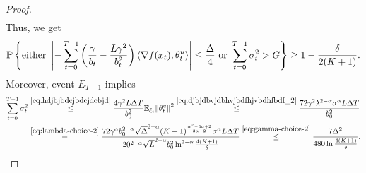 \documentclass{article}
\begin{document}
\begin{proof}
\begin{align*}
    \end{align*}
    Thus, we get
    \begin{align*}
        \mathbb{P}\left\{\text{either }\left|- \sum\limits_{t=0}^{T-1}\left(\frac{\gamma}{b_t} - \frac{L\gamma^2}{b_t^2}\right)\left \langle \nabla f(x_t), \theta_t^u \right \rangle\right| \leq \frac{\Delta}{4} \text{ or } \sum\limits_{t=0}^{T-1} \sigma_t^2 > G\right\} \geq 1 - \frac{\delta}{2(K+1)}.
    \end{align*}
    Moreover, event $E_{T-1}$ implies
    \begin{align*}
        \sum\limits_{t=0}^{T-1}\sigma_t^2 &\overset{\eqref{eq:hdjbjbdcjbdcjdcbjd}}{\leq} \frac{4\gamma^2 L\Delta T}{b_0^2}{\mathbb E}_{\xi_t}{\left\lVert\theta_t^u\right\rVert}^2 \overset{\eqref{eq:djbjdbvjdbhvjbdfhjvbdhfbdf_2}}{\leq} \frac{72\gamma^2\lambda^{2-\alpha}\sigma^\alpha L\Delta T}{b_0^2} \\
        &\overset{\eqref{eq:lambda-choice-2}}{=} \frac{72\gamma^\alpha b_0^{2-\alpha}\sqrt{\Delta}^{2-\alpha}(K+1)^{\frac{\alpha^2 - 3\alpha +2}{3\alpha -2}}\sigma^\alpha L\Delta T}{20^{2-\alpha}\sqrt{L}^{2 - \alpha}b_0^2 \ln^{2-\alpha}\frac{4(K+1)}{\delta}} \overset{\eqref{eq:gamma-choice-2}}{\leq} 
        \frac{7\Delta^2}{480\ln\frac{4(K+1)}{\delta}}.
    \end{align*}



\end{proof}
\end{document}
